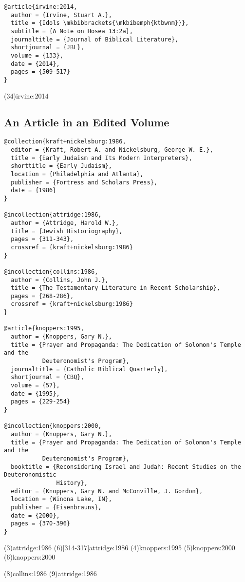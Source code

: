\documentclass[a4paper]{article}
\begin{document}
\begin{verbatim}
@article{irvine:2014,
  author = {Irvine, Stuart A.},
  title = {Idols \mkbibbrackets{\mkbibemph{ktbwnm}}},
  subtitle = {A Note on Hosea 13:2a},
  journaltitle = {Journal of Biblical Literature},
  shortjournal = {JBL},
  volume = {133},
  date = {2014},
  pages = {509-517}
}
\end{verbatim}

\examplecite(34){irvine:2014}
\exampleabbreviations
\examplebibliography

\subsection{An Article in an Edited Volume}

\begin{verbatim}
@collection{kraft+nickelsburg:1986,
  editor = {Kraft, Robert A. and Nickelsburg, George W. E.},
  title = {Early Judaism and Its Modern Interpreters},
  shorttitle = {Early Judaism},
  location = {Philadelphia and Atlanta},
  publisher = {Fortress and Scholars Press},
  date = {1986}
}

@incollection{attridge:1986,
  author = {Attridge, Harold W.},
  title = {Jewish Historiography},
  pages = {311-343},
  crossref = {kraft+nickelsburg:1986}
}

@incollection{collins:1986,
  author = {Collins, John J.},
  title = {The Testamentary Literature in Recent Scholarship},
  pages = {268-286},
  crossref = {kraft+nickelsburg:1986}
}

@article{knoppers:1995,
  author = {Knoppers, Gary N.},
  title = {Prayer and Propaganda: The Dedication of Solomon's Temple and the
           Deuteronomist's Program},
  journaltitle = {Catholic Biblical Quarterly},
  shortjournal = {CBQ},
  volume = {57},
  date = {1995},
  pages = {229-254}
}

@incollection{knoppers:2000,
  author = {Knoppers, Gary N.},
  title = {Prayer and Propaganda: The Dedication of Solomon's Temple and the
           Deuteronomist's Program},
  booktitle = {Reconsidering Israel and Judah: Recent Studies on the Deuteronomistic
               History},
  editor = {Knoppers, Gary N. and McConville, J. Gordon},
  location = {Winona Lake, IN},
  publisher = {Eisenbrauns},
  date = {2000},
  pages = {370-396}
}
\end{verbatim}

\examplecite(3){attridge:1986}
\examplecite(6)[314-317]{attridge:1986}
\examplecite(4){knoppers:1995}
\examplecite(5){knoppers:2000}
\examplecite(6){knoppers:2000}
\begin{verbcite}
  \citereset
\end{verbcite}
\examplecite(8){collins:1986}
\examplecite(9){attridge:1986}
\exampleabbreviations
\examplebibliography
\end{document}
